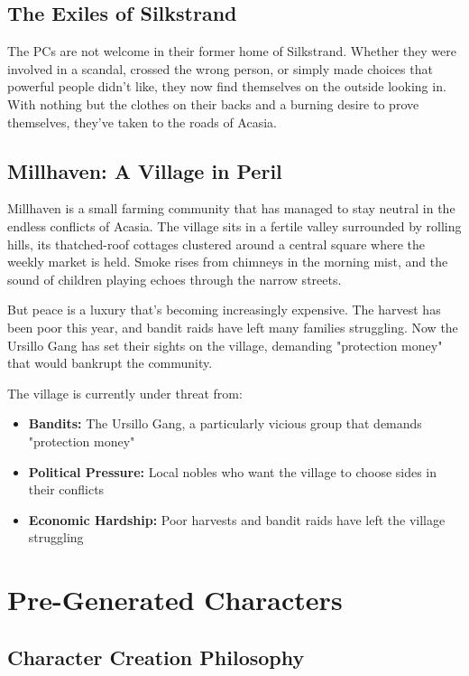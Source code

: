 \documentclass[11pt]{article}
\begin{document}
\subsection{The Exiles of Silkstrand}

The PCs are not welcome in their former home of Silkstrand. Whether they were involved in a scandal, crossed the wrong person, or simply made choices that powerful people didn't like, they now find themselves on the outside looking in. With nothing but the clothes on their backs and a burning desire to prove themselves, they've taken to the roads of Acasia.

\subsection{Millhaven: A Village in Peril}

Millhaven is a small farming community that has managed to stay neutral in the endless conflicts of Acasia. The village sits in a fertile valley surrounded by rolling hills, its thatched-roof cottages clustered around a central square where the weekly market is held. Smoke rises from chimneys in the morning mist, and the sound of children playing echoes through the narrow streets.

But peace is a luxury that's becoming increasingly expensive. The harvest has been poor this year, and bandit raids have left many families struggling. Now the Ursillo Gang has set their sights on the village, demanding "protection money" that would bankrupt the community.

The village is currently under threat from:
\begin{itemize}
\item \textbf{Bandits:} The Ursillo Gang, a particularly vicious group that demands "protection money"
\item \textbf{Political Pressure:} Local nobles who want the village to choose sides in their conflicts
\item \textbf{Economic Hardship:} Poor harvests and bandit raids have left the village struggling
\end{itemize}

\section{Pre-Generated Characters}

\subsection{Character Creation Philosophy}
\end{document}
